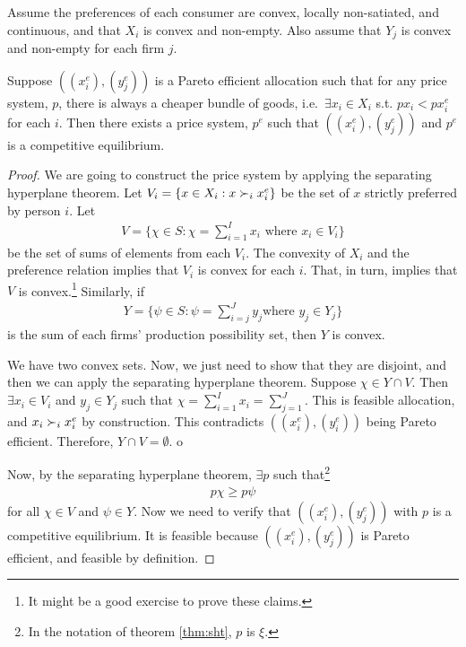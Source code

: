 \begin{theorem}
  Assume the preferences of each consumer are convex, locally
  non-satiated, and continuous, and that $X_i$ is convex and
  non-empty.  
  Also assume that $Y_j$ is convex and non-empty for each
  firm $j$. 

  Suppose $((x_i^e), (y_j^e))$ is a Pareto efficient allocation such
  that for any price system, $p$, there is always a cheaper bundle of
  goods, i.e.\ $\exists x_i \in X_i$ s.t. $p x_i < p x_i^e$ for each
  $i$. Then there exists a price system, $p^e$ such that $((x_i^e),
  (y_j^e))$ and $p^e$ is a competitive equilibrium.
\end{theorem}
\begin{proof}
  We are going to construct the price system by applying the
  separating hyperplane theorem. Let $V_i = \{ x \in X_i : x \succ_i
  x_i^e \}$ be the set of $x$ strictly preferred by person $i$. Let 
  \begin{align*}
    V = \{ \chi \in S: \chi = \sum_{i=1}^I x_i \text{ where } x_i
    \in V_i \}  
  \end{align*}
  be the set of sums of elements from each $V_i$. The convexity of
  $X_i$ and the preference relation implies that $V_i$ is convex for
  each $i$. That, in turn, implies that $V$ is convex.\footnote{It
    might be a good exercise to prove these claims. } 
  Similarly, if 
  \begin{align*}
    Y = \{ \psi \in S: \psi = \sum_{i=j}^J y_j \text{
      where } y_j \in Y_j \}  
  \end{align*}
  is the sum of each firms' production possibility set, then $Y$ is
  convex. 

  We have two convex sets. Now, we just need to show that they are
  disjoint, and then we can apply the separating hyperplane
  theorem. Suppose $\chi \in Y \cap V$. Then $\exists x_i \in V_i$ and
  $y_j \in Y_j$ such that $\chi = \sum_{i=1}^I x_i = \sum_{j=1}^J$. This
  is feasible allocation, and $x_i \succ_i x_i^e$ by
  construction. This contradicts $((x_i^e),(y_i^e))$ being Pareto
  efficient. Therefore, $Y \cap V = \emptyset$. o

  Now, by the separating hyperplane theorem, $\exists p$ such
  that\footnote{In the notation of theorem \ref{thm:sht}, $p$ is $\xi$.}
  \begin{align}
    p \chi \geq p \psi \label{ieq:p}
  \end{align}
  for all $\chi \in V$ and $\psi \in Y$. Now we need to verify
  that $((x_i^e),(y_j^e))$ with $p$ is a competitive equilibrium. It
  is feasible because $((x_i^e),(y_j^e))$ is Pareto efficient, and
  feasible by definition.
  

\end{proof}
